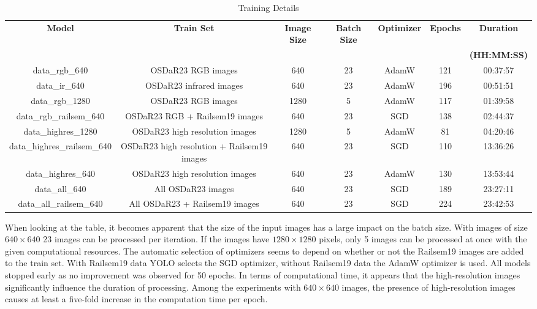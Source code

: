 \documentclass[Master,MDS,english]{BASE/twbook} %
\begin{document}
\begin{table}[htbp]
    \centering
    \tiny
    \begin{tabular}{|c|c|c|c|c|c|c|}
        \hline
        \textbf{Model} & \textbf{Train Set} & \textbf{Image Size} & \textbf{Batch Size} & \textbf{Optimizer} & \textbf{Epochs} & \textbf{Duration} \\
         &  &  &  &  &  &  \textbf{(HH:MM:SS)} \\
        \hline
        data\_rgb\_640 & OSDaR23 RGB images & 640 & 23 & AdamW & 121 & 00:37:57 \\
        data\_ir\_640 & OSDaR23 infrared images & 640 & 23 & AdamW & 196 & 00:51:51 \\
        data\_rgb\_1280 & OSDaR23 RGB images & 1280 & 5 & AdamW & 117 & 01:39:58 \\
        data\_rgb\_railsem\_640 & OSDaR23 RGB + Railsem19 images & 640 & 23 & SGD & 138 & 02:44:37 \\
        data\_highres\_1280 & OSDaR23 high resolution images & 1280 & 5 & AdamW & 81 & 04:20:46 \\
        data\_highres\_railsem\_640 & OSDaR23 high resolution + Railsem19 images & 640 & 23 & SGD & 110 & 13:36:26 \\
        data\_highres\_640 & OSDaR23 high resolution images & 640 & 23 & AdamW & 130 & 13:53:44 \\
        data\_all\_640 & All OSDaR23 images & 640 & 23 & SGD & 189 & 23:27:11 \\
        data\_all\_railsem\_640 & All OSDaR23 + Railsem19 images & 640 & 23 & SGD & 224 & 23:42:53 \\
        \hline
    \end{tabular}
    \caption{Training Details}
    \label{tab:training}
\end{table}
 
When looking at the table, it becomes apparent that the size of the input images has a large impact on the batch size. With images of size $640\times640$ 23 images can be processed per iteration. If the images have $1280\times1280$ pixels, only 5 images can be processed at once with the given computational resources. The automatic selection of optimizers seems to depend on whether or not the Railsem19 images are added to the train set. With Railsem19 data YOLO selects the SGD optimizer, without Railsem19 data the AdamW optimizer is used.   All models stopped early as no improvement was observed for 50 epochs. 
In terms of computational time, it appears that the high-resolution images significantly influence the duration of processing. Among the experiments with $640\times640$ images, the presence of high-resolution images causes at least a five-fold increase in the computation time per epoch.
\end{document}
